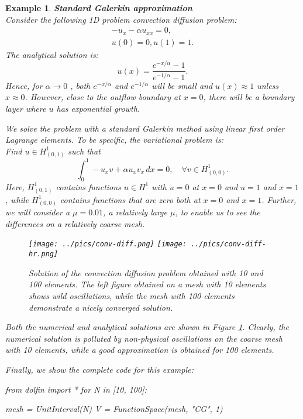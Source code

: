 \documentclass[a4paper,11pt]{amsart}
\newtheorem{example}{Example}[section]
\begin{document}
\begin{example}{\textbf{Standard Galerkin approximation}} \label{ex1} \\
Consider the following 1D problem convection diffusion problem: 
\begin{eqnarray}
-u_x - \alpha u_{xx} = 0, \\ 
u(0) = 0, u(1) = 1 . 
\end{eqnarray}
The analytical solution is: 
\[
u(x) = \frac{e^{-x/\alpha} - 1}{e^{-1/\alpha} - 1}. 
\]
Hence, for $\alpha \rightarrow 0$ , both $e^{-x/\alpha}$ and $e^{-1/\alpha}$ 
will be small and $u(x) \approx 1$ unless $x\approx 0$. However, close to the 
outflow boundary at $x=0$, there will be a boundary layer where $u$ has exponential growth. 

We solve the problem with a standard Galerkin method using linear first
order Lagrange elements. To be specific, the variational problem is: \\    
Find $u \in H^1_{(0,1)}$ such that 
\[
\int_0^1 -u_x v + \alpha u_x v_x \, dx   = 0, \quad \forall v \in H^1_{(0,0)} .  
\]
Here, $H^1_{(0,1)}$ contains functions $u\in H^1$ with $u=0$ at $x=0$ and $u=1$ and $x=1$, while
$H^1_{(0,0)}$ contains functions that are zero both at $x=0$ and $x=1$. Further, we
will consider a $\mu=0.01$, a relatively large $\mu$, to enable us to see the
differences on a relatively coarse mesh.     

\begin{figure}
\begin{center}
\texttt{[image: ../pics/conv-diff.png]}
\texttt{[image: ../pics/conv-diff-hr.png]}
\caption{Solution of the convection diffusion problem obtained with 10 and 100 elements. 
The left figure obtained on a mesh with 10 elements shows wild oscillations, while the 
mesh with 100 elements demonstrate a nicely converged solution.}
\label{fig:conv1}
\end{center}
\end{figure}

Both the numerical and analytical solutions are shown in Figure \ref{fig:conv1}. Clearly, 
the numerical solution is polluted by non-physical oscillations on the coarse
mesh with 10 elements, while a good approximation is obtained for 100 elements.     


Finally, we show the complete code for this example: 
\begin{python}
from dolfin import *
for N in [10, 100]:

  mesh = UnitInterval(N)
  V = FunctionSpace(mesh, "CG", 1)


\end{python}
\end{example}
\end{document}

